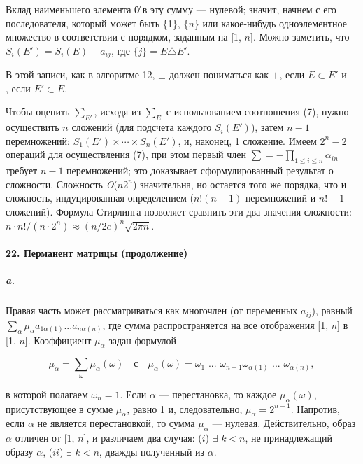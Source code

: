 \documentclass{../../template/mai_book}
\begin{document}
\noindent
Вклад наименьшего элемента 0̸  в эту сумму — нулевой; значит, начнем с его последователя, который может быть \{1\}, \{$n$\} или какое-нибудь одноэлементное множество в соответствии с порядком, заданным на [1, $n$]. Можно заметить, что $S_i(E') = S_i(E) \pm a_{ij}$, где $\{j\} = E \triangle E'$.

\newpage


\noindent
В этой записи, как в алгоритме 12, $\pm$ должен пониматься как $+$, если $E \subset E'$ и $-$, если $E' \subset E$.

Чтобы оценить ${\sum}_{E'}$, исходя из ${\sum}_E$ с использованием 
соотношения (7), нужно осуществить $n$ сложений (для подсчета каждого $S_i (E')$), затем $n - 1$ перемножений: $S_1(E') \times \cdots \times S_n(E')$, и, наконец, 1 сложение. Имеем $2^n - 2$ операций для осуществления (7), при этом первый член $\sum = -{\prod}_{1 \leqslant i \leqslant n} \alpha_{in}$ требует $n - 1$ перемножений; это доказывает сформулированный результат о сложности. Сложность \textit{O}($n2^n$) значительна, но остается того же порядка, что и сложность, индуцированная определением ($n!(n - 1)$ перемножений и $n! - 1$ сложений). Формула Стирлинга позволяет сравнить эти два значения сложности: $ n \cdot n!/(n \cdot 2^n) \approx (n/2e)^n \sqrt{2\pi n}$.

\paragraph{22. Перманент матрицы (продолжение)}

\subparagraph{a.} Правая часть может рассматриваться как многочлен (от переменных $a_{ij}$), равный ${\sum}_\alpha \mu_\alpha a_{1 \alpha(1)} ... a_{n \alpha(n)}$, где сумма распространяется на все отображения [1, $n$] в [1, $n$]. Коэффициент $\mu_\alpha$ задан формулой

\begin{equation*}
\mu_\alpha = \sum_\omega \mu_\alpha(\omega) \quad \text{с} \quad \mu_\alpha(\omega) = \omega_1 \text{ ... } \omega_{n - 1} \omega_{\alpha(1)} \text{ ... } \omega_{\alpha(n)},
\end{equation*}

\noindent
в которой полагаем $\omega_n = 1$. Если $\alpha$ — перестановка, то каждое $\mu_\alpha(\omega)$, присутствующее в сумме $\mu_\alpha$, равно 1 и, следовательно, $\mu_\alpha = 2^{n - 1}$. Напротив, если $\alpha$ не является перестановкой, то сумма $\mu_\alpha$ — нулевая. Действительно, образ $\alpha$ отличен от [1, $n$], и различаем два случая: \newline
\indent ($i$) $\exists$ $k < n$, не принадлежащий образу $\alpha$, \newline
\indent ($ii$) $\exists$ $k < n$, дважды полученный из $\alpha$.
\end{document}
